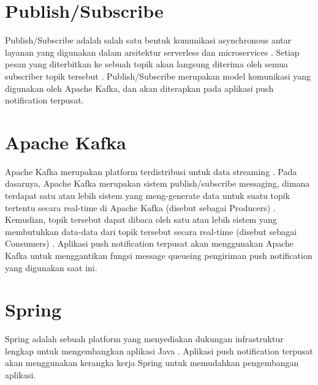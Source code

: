 \section{Publish/Subscribe}
\par Publish/Subscribe adalah salah satu bentuk komunikasi asynchronous antar layanan yang digunakan dalam arsitektur serverless dan microservices \cite{publish-subscribe-online}. Setiap pesan yang diterbitkan ke sebuah topik akan langsung diterima oleh semua subscriber topik tersebut \cite{publish-subscribe-online}. Publish/Subscribe merupakan model komunikasi yang digunakan oleh Apache Kafka, dan akan diterapkan pada aplikasi push notification terpusat.

\section{Apache Kafka}
\par Apache Kafka merupakan platform terdistribusi untuk data streaming \cite{kafka-online}. Pada dasarnya, Apache Kafka merupakan sistem publish/subscribe messaging, dimana terdapat satu atau lebih sistem yang meng-generate data untuk suatu topik tertentu secara real-time di Apache Kafka (disebut sebagai Producers) \cite{kafka-online}. Kemudian, topik tersebut dapat dibaca oleh satu atau lebih sistem yang membutuhkan data-data dari topik tersebut secara real-time (disebut sebagai Consumers) \cite{kafka-online}. Aplikasi push notification terpusat akan menggunakan Apache Kafka untuk menggantikan fungsi message queueing pengiriman push notification yang digunakan saat ini.

\section{Spring}
\par Spring adalah sebuah platform yang menyediakan dukungan infrastruktur lengkap untuk mengembangkan aplikasi Java \cite{spring-online}. Aplikasi push notification terpusat akan menggunakan kerangka kerja Spring untuk memudahkan pengembangan aplikasi.
